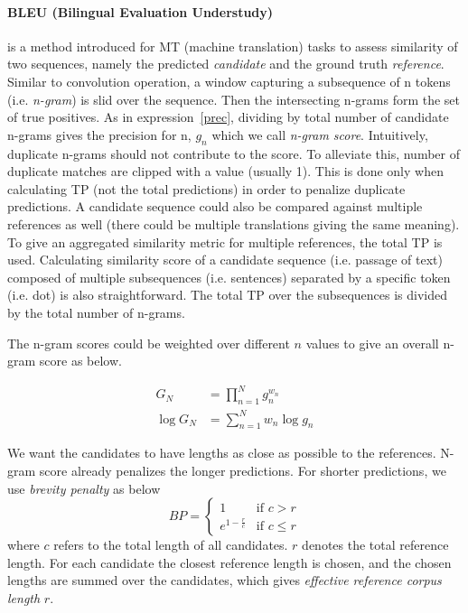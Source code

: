 \documentclass{article}
\begin{document}
\paragraph{BLEU (Bilingual Evaluation Understudy)}
is a method introduced for MT (machine translation) tasks to assess similarity of two sequences, namely the predicted \textit{candidate} and the ground truth \textit{reference}. Similar to convolution operation, a window capturing a subsequence of n tokens (i.e. \textit{n-gram}) is slid over the sequence. Then the intersecting n-grams form the set of true positives. As in expression~\ref{prec}, dividing by total number of candidate n-grams gives the precision for n, $g_n$ which we call \textit{n-gram score}. Intuitively, duplicate n-grams should not contribute to the score. To alleviate this, number of duplicate matches are clipped with a value (usually 1). This is done only when calculating TP (not the total predictions) in order to penalize duplicate predictions. A candidate sequence could also be compared against multiple references as well (there could be multiple translations giving the same meaning). To give an aggregated similarity metric for multiple references, the total TP is used. Calculating similarity score of a candidate sequence (i.e. passage of text) composed of multiple subsequences (i.e. sentences) separated by a specific token (i.e. dot) is also straightforward. The total TP over the subsequences is divided by the total number of n-grams. 

The n-gram scores could be weighted over different $n$ values to give an overall n-gram score as below.

\begin{align}
    G_N &= \prod_{n=1}^{N}g_n^{w_n}\\
    \log G_N &= \sum_{n=1}^{N}w_n\log g_n
\end{align}

We want the candidates to have lengths as close as possible to the references. N-gram score already penalizes the longer predictions. For shorter predictions, we use \textit{brevity penalty} as below
\begin{equation}
    BP = \begin{cases}
        1 & \text{if } c > r\\
        e^{1-\frac{r}{c}} & \text{if } c \leq r
    \end{cases}
\end{equation}
where $c$ refers to the total length of all candidates. $r$ denotes the total reference length. For each candidate the closest reference length is chosen, and the chosen lengths are summed over the candidates, which gives \textit{effective reference corpus length} $r$.
\end{document}
